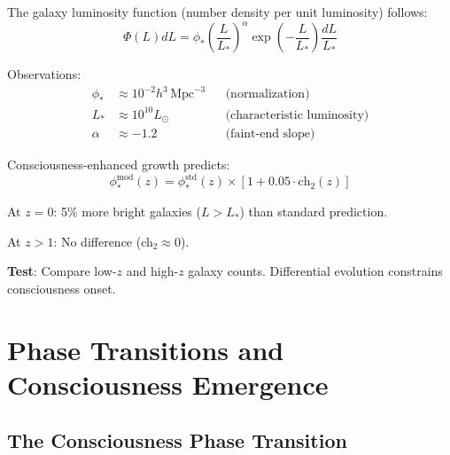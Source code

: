 \begin{defn}\label{def:schechter}
The galaxy luminosity function (number density per unit luminosity) follows\cite{schechter1976}:
\begin{equation}
\Phi(L) dL = \phi_* \left( \frac{L}{L_*} \right)^\alpha \exp\left( -\frac{L}{L_*} \right) \frac{dL}{L_*}
\end{equation}

Observations\cite{blanton2003}:
\begin{align}
\phi_* &\approx 10^{-2} h^3 \, \text{Mpc}^{-3} && \text{(normalization)} \\
L_* &\approx 10^{10} L_\odot && \text{(characteristic luminosity)} \\
\alpha &\approx -1.2 && \text{(faint-end slope)}
\end{align}
\end{defn}

\begin{proposition}\label{prop:galaxy-counts-consciousness}
Consciousness-enhanced growth predicts:
\begin{equation}
\phi_*^{\text{mod}}(z) = \phi_*^{\text{std}}(z) \times [1 + 0.05 \cdot \text{ch}_2(z)]
\end{equation}

At $z = 0$: 5\% more bright galaxies ($L > L_*$) than standard prediction.

At $z > 1$: No difference (ch$_2 \approx 0$).

\textbf{Test}: Compare low-$z$ and high-$z$ galaxy counts. Differential evolution constrains consciousness onset.
\end{proposition}

\section{Phase Transitions and Consciousness Emergence}

\subsection{The Consciousness Phase Transition}

